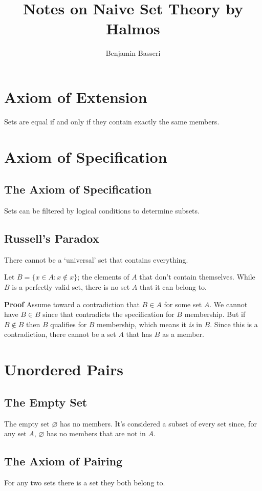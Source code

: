 \documentclass{article}
\title{Notes on Naive Set Theory by Halmos}
\author{Benjamin Basseri}
\date{ }
\begin{document}
\maketitle

\section{Axiom of Extension}

Sets are equal if and only if they contain exactly the same members.

\section{Axiom of Specification}

\subsection{The Axiom of Specification} Sets can be filtered by logical conditions to determine subsets.

\subsection{Russell's Paradox} There cannot be a `universal' set that contains everything. 

Let $B = \{x \in A: x \not\in x\}$; the elements of $A$ that don't contain themselves. While $B$ is a perfectly valid set, there is no set $A$ that it can belong to.

\textbf{Proof} Assume toward a contradiction that $B \in A$ for some set $A$. We cannot have $B \in B$ since that contradicts the specification for $B$ membership. But if $B \not\in B$ then $B$ qualifies for $B$ membership, which means it \textit{is} in $B$. Since this is a contradiction, there cannot be a set $A$ that has $B$ as a member.

\section{Unordered Pairs}

\subsection{The Empty Set} The empty set $\varnothing$ has no members. It's considered a subset of every set since, for any set $A$, $\varnothing$ has no members that are not in $A$.

\subsection{The Axiom of Pairing} For any two sets there is a set they both belong to. 
\end{document}
